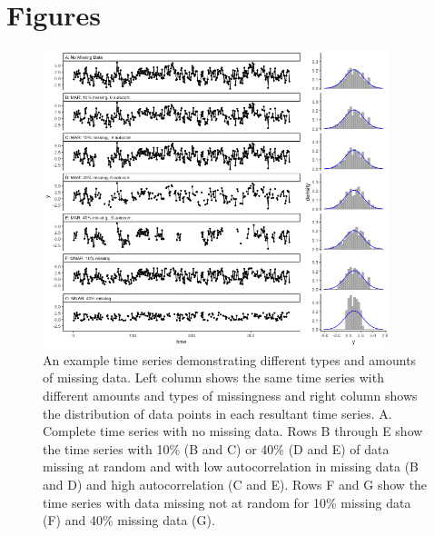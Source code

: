 \documentclass{article}
\begin{document}
\begin{linenumbers}


\end{linenumbers}

\newpage


\section*{Figures}

\begin{figure}[h]
     \noindent\includegraphics[width = 0.9\textwidth]{Figures/CompareMissingnessTypes_fig.png}
     \caption{An example time series demonstrating different types and amounts of missing data. Left column shows the same time series with different amounts and types of missingness and right column shows the distribution of data points in each resultant time series. A. Complete time series with no missing data. Rows B through E show the time series with 10\% (B and C) or 40\% (D and E) of data missing at random and with low autocorrelation in missing data (B and D) and high autocorrelation (C and E). Rows F and G show the time series with data missing not at random for 10\% missing data (F) and 40\% missing data (G).}
     \label{fig:missingtypes}
 \end{figure}
\end{document}

